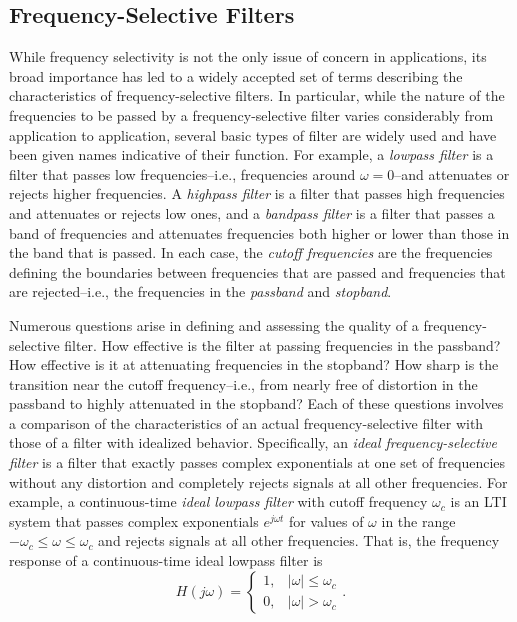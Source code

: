 \documentclass[a4paper,10pt,twoside]{book}
\begin{document}
\subsection{Frequency-Selective Filters}

While frequency selectivity is not the only issue of concern in applications, its broad importance has led to a widely accepted set of terms describing the characteristics of frequency-selective filters. In particular, while the nature of the frequencies to be passed by a frequency-selective filter varies considerably from application to application, several basic types of filter are widely used and have been given names indicative of their function. For example, a \textit{lowpass filter} is a filter that passes low frequencies--i.e., frequencies around $\omega=0$--and attenuates or rejects higher frequencies. A \textit{highpass filter} is a filter that passes high frequencies and attenuates or rejects low ones, and a \textit{bandpass filter} is a filter that passes a band of frequencies and attenuates frequencies both higher or lower than those in the band that is passed. In each case, the \textit{cutoff frequencies} are the frequencies defining the boundaries between frequencies that are passed and frequencies that are rejected--i.e., the frequencies in the \textit{passband} and \textit{stopband}.

Numerous questions arise in defining and assessing the quality of a frequency-selective filter. How effective is the filter at passing frequencies in the passband? How effective is it at attenuating frequencies in the stopband? How sharp is the transition near the cutoff frequency--i.e., from nearly free of distortion in the passband to highly attenuated in the stopband? Each of these questions involves a comparison of the characteristics of an actual frequency-selective filter with those of a filter with idealized behavior. Specifically, an \textit{ideal frequency-selective filter} is a filter that exactly passes complex exponentials at one set of frequencies without any distortion and completely rejects signals at all other frequencies. For example, a continuous-time \textit{ideal lowpass filter} with cutoff frequency $\omega_c$ is an LTI system that passes complex exponentials $e^{j\omega t}$ for values of $\omega$ in the range $-\omega_c\le\omega\le\omega_c$ and rejects signals at all other frequencies. That is, the frequency response of a continuous-time ideal lowpass filter is
\begin{equation}
    \left.H(j\omega)=\left\{\begin{array}{ll}1,&|\omega|\leq\omega_c\\0,&|\omega|>\omega_c\end{array}\right.\right..
    \label{3.140}
\end{equation}
\end{document}
